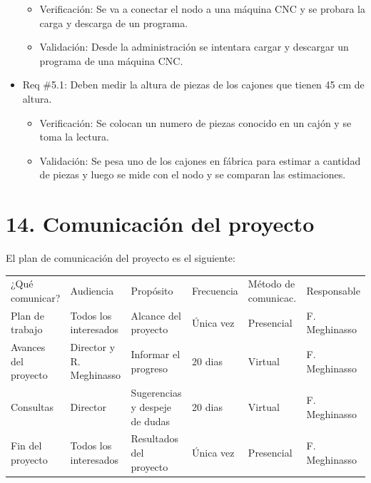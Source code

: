 \documentclass[11pt]{charter}
\begin{document}
\begin{itemize}
    \begin{itemize}
        \item Verificación: Se va a conectar el nodo a una máquina CNC y se probara la carga y descarga de un programa. 
        \item Validación: Desde la administración se intentara cargar y descargar un programa de una máquina CNC.
    \end{itemize}
    \item Req \#5.1: Deben medir la altura de piezas de los cajones que tienen 45 cm de altura.
    \begin{itemize}
        \item Verificación: Se colocan un numero de piezas conocido en un cajón y se toma la lectura.  
        \item Validación: Se pesa uno de los cajones en fábrica para estimar a cantidad de piezas y luego se mide con el nodo y se comparan las estimaciones.  
    \end{itemize}
\end{itemize}


\section{14. Comunicación del proyecto}
\label{sec:comunicaciones}

El plan de comunicación del proyecto es el siguiente:

\begin{table}[htpb]
\centering
\begin{tabularx}{\linewidth}{@{}|X|C{2.4cm}|C{3cm}|C{1.8cm}|C{2cm}|C{2.1cm}|@{}}
\hline
{} 
           \\ \hline
{} 
¿Qué comunicar? & Audiencia & Propósito & Frecuencia & Método de comunicac. & Responsable \\ \hline
 Plan de trabajo  & Todos los interesados  &  Alcance del proyecto  &  Única vez   &  Presencial  & F. Meghinasso  \\ \hline
Avances del proyecto   &   Director y R. Meghinasso  &  Informar el progreso  &  20 dias  & Virtual &  F. Meghinasso  \\ \hline
Consultas   &  Director  & Sugerencias y despeje de dudas & 20 dias  &  Virtual & F. Meghinasso \\ \hline
Fin del proyecto  & Todos los interesados & Resultados del proyecto  & Única vez & Presencial & F. Meghinasso \\ \hline
\end{tabularx}
\end{table}
\end{document}
